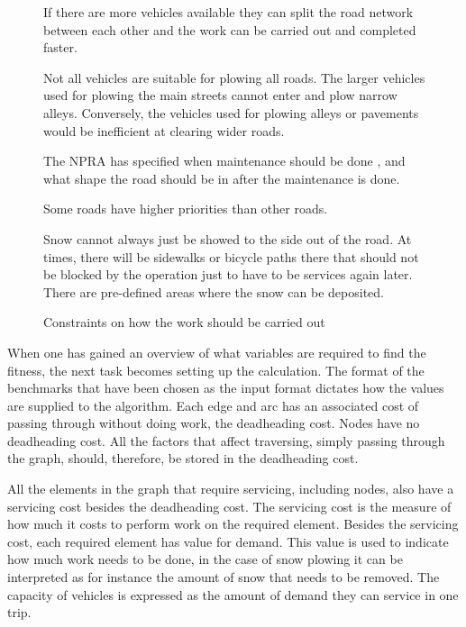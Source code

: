 \begin{figure}[thbp]
\caption{Constraints on how the work should be carried out}
\label{fig:imposed_constraints}
\begin{description}
    \item [Equipment -- Amount of vehicles available.] If there are more vehicles available they can split the road network between each other and the work can be carried out and completed faster.
    \item [Equipment -- Types of vehicles available.] Not all vehicles are suitable for plowing all roads. The larger vehicles used for plowing the main streets cannot enter and plow narrow alleys. Conversely, the vehicles used for plowing alleys or pavements would be inefficient at clearing wider roads.
    \item [The weather.] The NPRA has specified when maintenance should be done \citep{svvR610}, and what shape the road should be in after the maintenance is done.
    \item [The type of road.] Some roads have higher priorities than other roads.
    \item [Where the snow can be stored.] Snow cannot always just be showed to the side out of the road. At times, there will be sidewalks or bicycle paths there that should not be blocked by the operation just to have to be services again later. There are pre-defined areas where the snow can be deposited.
\end{description}
\end{figure}

When one has gained an overview of what variables are required to find the fitness, the next task becomes setting up the calculation. The format of the benchmarks that have been chosen as the input format dictates how the values are supplied to the algorithm. Each edge and arc has an associated cost of passing through without doing work, the deadheading cost. Nodes have no deadheading cost. All the factors that affect traversing, simply passing through the graph, should, therefore, be stored in the deadheading cost.

All the elements in the graph that require servicing, including nodes, also have a servicing cost besides the deadheading cost. The servicing cost is the measure of how much it costs to perform work on the required element. Besides the servicing cost, each required element has value for demand. This value is used to indicate how much work needs to be done, in the case of snow plowing it can be interpreted as for instance the amount of snow that needs to be removed. The capacity of vehicles is expressed as the amount of demand they can service in one trip.

